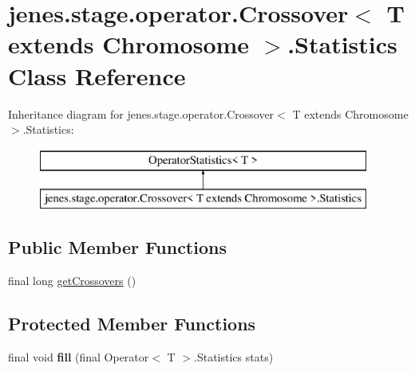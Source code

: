 \hypertarget{classjenes_1_1stage_1_1operator_1_1_crossover_3_01_t_01extends_01_chromosome_01_4_1_1_statistics}{\section{jenes.\-stage.\-operator.\-Crossover$<$ T extends Chromosome $>$.Statistics Class Reference}
\label{classjenes_1_1stage_1_1operator_1_1_crossover_3_01_t_01extends_01_chromosome_01_4_1_1_statistics}
}
Inheritance diagram for jenes.\-stage.\-operator.\-Crossover$<$ T extends Chromosome $>$.Statistics\-:\begin{figure}[H]
\begin{center}
\leavevmode
\includegraphics[height=2.000000cm]{classjenes_1_1stage_1_1operator_1_1_crossover_3_01_t_01extends_01_chromosome_01_4_1_1_statistics}
\end{center}
\end{figure}
\subsection*{Public Member Functions}
\begin{DoxyCompactItemize}
\item 
final long \hyperlink{classjenes_1_1stage_1_1operator_1_1_crossover_3_01_t_01extends_01_chromosome_01_4_1_1_statistics_a6181ee46b3e760f5d440e758d95db04b}{get\-Crossovers} ()
\end{DoxyCompactItemize}
\subsection*{Protected Member Functions}
\begin{DoxyCompactItemize}
\item 
\hypertarget{classjenes_1_1stage_1_1operator_1_1_crossover_3_01_t_01extends_01_chromosome_01_4_1_1_statistics_ae352590e85b1d1d821b0912a770f257a}{final void {\bfseries fill} (final Operator$<$ T $>$.Statistics stats)}\label{classjenes_1_1stage_1_1operator_1_1_crossover_3_01_t_01extends_01_chromosome_01_4_1_1_statistics_ae352590e85b1d1d821b0912a770f257a}

\end{DoxyCompactItemize}
